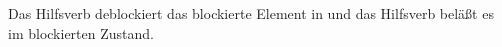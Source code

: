 {\noindent
Das Hilfsverb \haben deblockiert das blockierte Element in \subj und das Hilfsverb \sein
beläßt es im blockierten Zustand.




}
